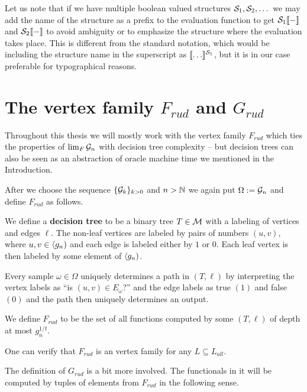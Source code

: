 Let us note that if we have multiple boolean valued structures $\S_1,\S_2,\dots$ we may add the name of the structure as a prefix to the evaluation function to get $\S_1\bbl-\bbr$ and $\S_2\bbl-\bbr$ to avoid ambiguity or to emphasize the structure where the evaluation takes place. This is different from the standard notation, which would be including the structure name in the superscript as $\bbl\dots\bbr^{\S_1}$, but it is in our case preferable for typographical reasons.
 
\section{The vertex family $F_{rud}$ and $G_{rud}$}\label{secFrud}

Throughout this thesis we will mostly work with the vertex family $F_{rud}$ which ties the properties of $\lim_F \G_n$ with decision tree complexity -- but decision trees can also be seen as an abstraction of oracle machine time we mentioned in the Introduction.

After we choose the sequence $\{\G_k\}_{k>0}$ and $n>\N$ we again put $\Omega:=\G_n$ and define $F_{rud}$ as follows.

\begin{defi}
We define a \textbf{decision tree} to be a binary tree $T\in\M$ with a labeling of vertices and edges $\ell$. The non-leaf vertices are labeled by pairs of numbers $(u,v)$, where $u,v\in\set{g_n}$ and each edge is labeled either by $1$ or $0$. Each leaf vertex is then labeled by some element of $\set{g_n}$.

Every sample $\omega\in\Omega$ uniquely determines a path in $(T,\ell)$ by interpreting the vertex labels as ``is $(u,v)\in E_\omega$?'' and the edge labels as true $(1)$ and false $(0)$ and the path then uniquely determines an output.

We define $F_{rud}$ to be the set of all functions computed by some $(T,\ell)$ of depth at most $g_n^{1/t}$.
\end{defi}


One can verify that $F_{rud}$ is an vertex family for any $L\subseteq L_{all}$.

The definition of $G_{rud}$ is a bit more involved. The functionals in it will be computed by tuples of elements from $F_{rud}$ in the following sense.


